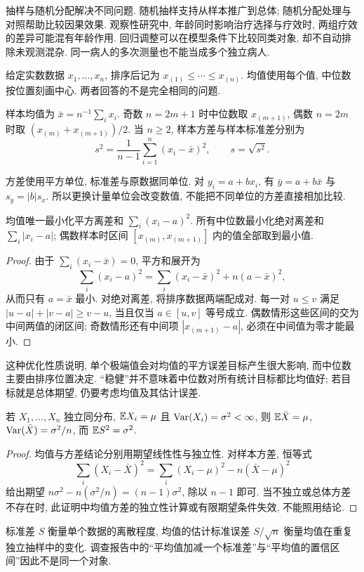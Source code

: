 抽样与随机分配解决不同问题. 随机抽样支持从样本推广到总体; 随机分配处理与对照帮助比较因果效果. 观察性研究中, 年龄同时影响治疗选择与疗效时, 两组疗效的差异可能混有年龄作用. 回归调整可以在模型条件下比较同类对象, 却不自动排除未观测混杂. 同一病人的多次测量也不能当成多个独立病人.

给定实数数据 $x_1,\ldots,x_n$, 排序后记为 $x_{(1)}\le\cdots\le x_{(n)}$. 均值使用每个值, 中位数按位置刻画中心. 两者回答的不是完全相同的问题.

\begin{definition}
样本均值为 $\bar x=n^{-1}\sum_ix_i$. 奇数 $n=2m+1$ 时中位数取 $x_{(m+1)}$, 偶数 $n=2m$ 时取 $(x_{(m)}+x_{(m+1)})/2$. 当 $n\ge2$, 样本方差与样本标准差分别为
\[
 s^2=\frac{1}{n-1}\sum_{i=1}^n(x_i-\bar x)^2,\qquad s=\sqrt{s^2}.
\]
\end{definition}
方差使用平方单位, 标准差与原数据同单位. 对 $y_i=a+bx_i$, 有 $\bar y=a+b\bar x$ 与 $s_y=|b|s_x$. 所以更换计量单位会改变数值, 不能把不同单位的方差直接相加比较.

\begin{proposition}
均值唯一最小化平方离差和 $\sum_i(x_i-a)^2$. 所有中位数最小化绝对离差和 $\sum_i|x_i-a|$; 偶数样本时区间 $[x_{(m)},x_{(m+1)}]$ 内的值全部取到最小值.
\end{proposition}
\begin{proof}
由于 $\sum_i(x_i-\bar x)=0$, 平方和展开为
\[
 \sum_i(x_i-a)^2=\sum_i(x_i-\bar x)^2+n(a-\bar x)^2,
\]
从而只有 $a=\bar x$ 最小. 对绝对离差, 将排序数据两端配成对. 每一对 $u\le v$ 满足 $|u-a|+|v-a|\ge v-u$, 当且仅当 $a\in[u,v]$ 等号成立. 偶数情形这些区间的交为中间两值的闭区间; 奇数情形还有中间项 $|x_{(m+1)}-a|$, 必须在中间值为零才能最小.
\end{proof}
这种优化性质说明, 单个极端值会对均值的平方误差目标产生很大影响, 而中位数主要由排序位置决定. “稳健”并不意味着中位数对所有统计目标都比均值好; 若目标就是总体期望, 仍要考虑均值及其估计误差.

\begin{proposition}
若 $X_1,\ldots,X_n$ 独立同分布, $\mathbb E X_i=\mu$ 且 $\operatorname{Var}(X_i)=\sigma^2<\infty$, 则 $\mathbb E\bar X=\mu$, $\operatorname{Var}(\bar X)=\sigma^2/n$, 而 $\mathbb E S^2=\sigma^2$.
\end{proposition}
\begin{proof}
均值与方差结论分别用期望线性性与独立性. 对样本方差, 恒等式
\[
 \sum_i(X_i-\bar X)^2=\sum_i(X_i-\mu)^2-n(\bar X-\mu)^2
\]
给出期望 $n\sigma^2-n(\sigma^2/n)=(n-1)\sigma^2$, 除以 $n-1$ 即可. 当不独立或总体方差不存在时, 此证明中均值方差的独立性计算或有限期望条件失效, 不能照用结论.
\end{proof}
标准差 $S$ 衡量单个数据的离散程度, 均值的估计标准误差 $S/\sqrt n$ 衡量均值在重复独立抽样中的变化. 调查报告中的“平均值加减一个标准差”与“平均值的置信区间”因此不是同一个对象.

